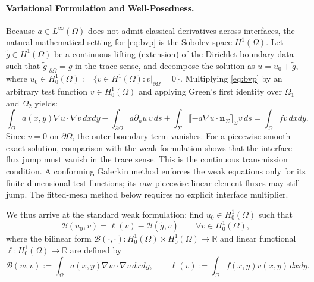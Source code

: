 \documentclass[11pt,a4paper]{article}
\theoremstyle{definition}
\theoremstyle{remark}
\begin{document}
\paragraph{Variational Formulation and Well-Posedness.}
Because $a \in L^\infty(\Omega)$ does not admit classical derivatives across interfaces, the natural mathematical setting for \eqref{eq:bvp} is the Sobolev space $H^1(\Omega)$. Let $\tilde{g} \in H^1(\Omega)$ be a continuous lifting (extension) of the Dirichlet boundary data such that $\tilde{g}|_{\partial\Omega} = g$ in the trace sense, and decompose the solution as $u = u_0 + \tilde{g}$, where $u_0 \in H_0^1(\Omega) := \{v \in H^1(\Omega) : v|_{\partial\Omega} = 0\}$. Multiplying \eqref{eq:bvp} by an arbitrary test function $v \in H_0^1(\Omega)$ and applying Green's first identity over $\Omega_1$ and $\Omega_2$ yields:
\begin{equation}
    \int_\Omega a(x,y)\nabla u \cdot \nabla v \, dxdy - \int_{\partial\Omega} a\partial_n u \, v \, ds + \int_\Sigma \llbracket -a\nabla u \cdot \bm{n}_\Sigma \rrbracket_\Sigma v \, ds = \int_\Omega f v \, dxdy.
    \label{eq:green_split}
\end{equation}
Since $v=0$ on $\partial\Omega$, the outer-boundary term vanishes.
For a piecewise-smooth exact solution, comparison with the weak formulation
shows that the interface flux jump must vanish in the trace sense. This is
the continuous transmission condition. A conforming Galerkin method enforces
the weak equations only for its finite-dimensional test functions; its raw
piecewise-linear element fluxes may still jump. The fitted-mesh method below
requires no explicit interface multiplier.

We thus arrive at the standard weak formulation: find $u_0 \in H_0^1(\Omega)$ such that
\begin{equation}
    \mathcal{B}(u_0, v) = \ell(v) - \mathcal{B}(\tilde{g}, v) \qquad \forall v \in H_0^1(\Omega),
    \label{eq:weak_form}
\end{equation}
where the bilinear form $\mathcal{B}(\cdot,\cdot): H_0^1(\Omega) \times H_0^1(\Omega) \to \mathbb{R}$ and linear functional $\ell: H_0^1(\Omega) \to \mathbb{R}$ are defined by
\begin{equation}
    \mathcal{B}(w, v) := \int_\Omega a(x,y)\nabla w \cdot \nabla v \, dxdy, \qquad \ell(v) := \int_\Omega f(x,y) v(x,y) \, dxdy.
    \label{eq:bilinear_def}
\end{equation}
\end{document}
